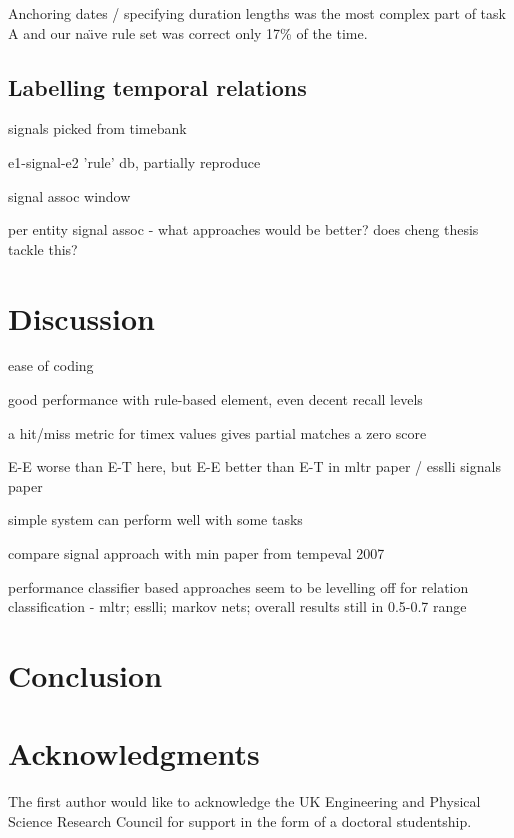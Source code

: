 \documentclass[11pt]{article}
\begin{document}
Anchoring dates / specifying duration lengths was the most complex part of task A and our na\"{\i}ve rule set was correct only 17\% of the time.

\subsection{Labelling temporal relations}
\label{tlink} 

signals picked from timebank

e1-signal-e2 'rule' db, partially reproduce

signal assoc window

per entity signal assoc - what approaches would be better? does cheng thesis tackle this?

\section{Discussion}
\label{discussion}

ease of coding

good performance with rule-based element, even decent recall levels

a hit/miss metric for timex values gives partial matches a zero score

E-E worse than E-T here, but E-E better than E-T in mltr paper / esslli signals paper

simple system can perform well with some tasks

compare signal approach with min paper from tempeval 2007

performance classifier based approaches seem to be levelling off for relation classification - mltr; esslli; markov nets; overall results still in 0.5-0.7 range

\section{Conclusion}
\label{conclusion}

\section*{Acknowledgments}
The first author would like to acknowledge the UK Engineering and Physical Science Research Council for support in the form of a doctoral studentship.



\end{document}
